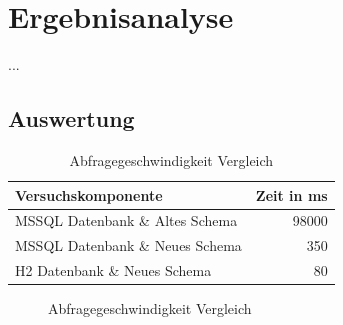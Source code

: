 
\chapter{Ergebnisanalyse}

...

\section{Auswertung}


\begin{table}[htbp]
\centering
\label{table:vergleich_abfragegeschwindigkeit}
\begin{tabular} {l | r}
Versuchskomponente & Zeit in ms  \\ \hline
MSSQL Datenbank \& Altes Schema & 98000 \\
MSSQL Datenbank \& Neues Schema & 350 \\
H2 Datenbank \& Neues Schema & 80 \\
\end{tabular}
\caption{Abfragegeschwindigkeit Vergleich}
\end{table}


\begin{figure}[htbp]
\centering
{}\hfill
{}\hfill
{}
\caption{Abfragegeschwindigkeit Vergleich}
\label{ergebniss_vergleich}
\end{figure}

